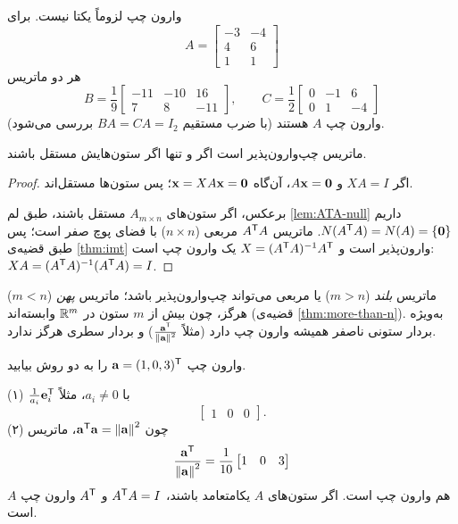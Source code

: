 وارون چپ لزوماً یکتا نیست. برای 
\[
A=\begin{bmatrix}-3&-4\\4&6\\1&1\end{bmatrix}
\]
هر دو ماتریس
\[
B=\frac19\begin{bmatrix}-11&-10&16\\7&8&-11\end{bmatrix},\qquad
C=\frac12\begin{bmatrix}0&-1&6\\0&1&-4\end{bmatrix}
\]
وارون چپ $A$ هستند (با ضرب مستقیم $BA=CA=I_2$ بررسی می‌شود).

\begin{theorem}\label{thm:left-inv}
ماتریس چپ‌وارون‌پذیر است اگر و تنها اگر ستون‌هایش مستقل باشند.
\end{theorem}
\begin{proof}
اگر $XA=I$ و $A\mathbf{x}=\mathbf{0}$، آن‌گاه $\mathbf{x}=XA\mathbf{x}=\mathbf{0}$؛ پس ستون‌ها مستقل‌اند.

برعکس، اگر ستون‌های $A_{m\times n}$ مستقل باشند، طبق لم \ref{lem:ATA-null} داریم $N(A^{\mathsf{T}} A)=N(A)=\{\mathbf{0}\}$. ماتریس $A^{\mathsf{T}} A$ مربعی ($n\times n$) با فضای پوچ  صفر است؛ پس طبق قضیه‌ی \ref{thm:imt} وارون‌پذیر است و
$X=(A^{\mathsf{T}} A)^{-1}A^{\mathsf{T}}$
یک وارون چپ است: $XA=(A^{\mathsf{T}} A)^{-1}(A^{\mathsf{T}} A)=I$.
\end{proof}

\begin{note}
ماتریس \emph{بلند} ($m>n$) یا مربعی می‌تواند چپ‌وارون‌پذیر باشد؛ ماتریس \emph{پهن} ($m<n$) هرگز، چون بیش از $m$ ستون در $\mathbb{R}^m$ وابسته‌اند (قضیه‌ی \ref{thm:more-than-n}). به‌ویژه بردار ستونی ناصفر همیشه وارون چپ دارد (مثلاً $\frac{\mathbf{a}^{\mathsf{T}}}{\left\lVert \mathbf{a}\right\rVert^2}$) و بردار سطری هرگز ندارد.
\end{note}

\begin{example}
وارون چپ $\mathbf{a}=(1,0,3)^{\mathsf{T}}$ را به دو روش بیابید.
\end{example}
\begin{solution}
(۱) $\frac1{a_i}\mathbf{e}_i^{\mathsf{T}}$ با $a_i\neq0$، مثلاً 
\[
\begin{bmatrix}1&0&0\end{bmatrix}.
\]
 \quad (۲) چون $\mathbf{a}^{\mathsf{T}}\mathbf{a}=\left\lVert \mathbf{a}\right\rVert^2$، ماتریس 
\[
\frac{\mathbf{a}^{\mathsf{T}}}{\left\lVert \mathbf{a}\right\rVert^2}=\frac1{10}\begin{bmatrix}1&0&3\end{bmatrix}
\]
هم وارون چپ است. اگر ستون‌های $A$ یکامتعامد  باشند، $A^{\mathsf{T}} A=I$ و $A^{\mathsf{T}}$ وارون چپ $A$ است.
\end{solution}

